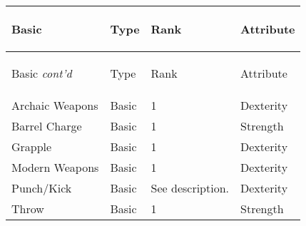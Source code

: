 \documentclass[twoside]{book}
\begin{document}
\begin{longtable}{p{1.25in}lll} 
  Basic& \begin{turn}{70}{Type}\end{turn}
          & \begin{turn}{70}{Rank}\end{turn}
          & \begin{turn}{70}{Attribute}\end{turn}
          \\
  \hline
  \hline
  \endfirsthead
  Basic \textit{cont'd}
        & \begin{turn}{70}{Type}\end{turn}
          & \begin{turn}{70}{Rank}\end{turn}
          & \begin{turn}{70}{Attribute}\end{turn}
           \\
  \hline
  \endhead
\raggedright  Archaic Weapons& Basic& 1& Dexterity\tabularnewline
      \raggedright  Barrel Charge& Basic& 1& Strength\tabularnewline
      \raggedright  Grapple& Basic& 1& Dexterity\tabularnewline
      \raggedright  Modern Weapons& Basic& 1& Dexterity\tabularnewline
      \raggedright  Punch/Kick& Basic& See description.& Dexterity\tabularnewline
      \raggedright  Throw& Basic& 1& Strength\tabularnewline
      
\end{longtable}
    
\end{document}
